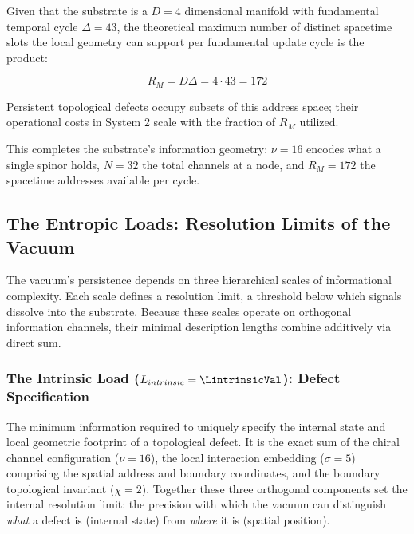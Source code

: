 Given that the substrate is a $D=4$ dimensional manifold with fundamental temporal cycle $\Delta=43$, the theoretical maximum number of distinct spacetime slots the local geometry can support per fundamental update cycle is the product:

\begin{equation}
    R_M = D\Delta = 4 \cdot 43 = 172
\end{equation}

Persistent topological defects occupy subsets of this address space; their operational costs in System 2 scale with the fraction of $R_M$ utilized.

This completes the substrate's information geometry: $\nu=16$ encodes what a single spinor holds, $N=32$ the total channels at a node, and $R_M=172$ the spacetime addresses available per cycle.


\subsection{The Entropic Loads: Resolution Limits of the Vacuum}
\label{sec:lattice_loads}

The vacuum's persistence depends on three hierarchical scales of informational complexity. Each scale defines a resolution limit, a threshold below which signals dissolve into the substrate. Because these scales operate on orthogonal information channels, their minimal description lengths combine additively via direct sum.

\subsubsection{The Intrinsic Load (\texorpdfstring{$L_{intrinsic} = \LintrinsicVal$}{Lintrinsic}): Defect Specification}
\label{subsub:lintrinsic}
The minimum information required to uniquely specify the internal state and local geometric footprint of a topological defect. It is the exact sum of the chiral channel configuration ($\nu=16$), the local interaction embedding ($\sigma=5$) comprising the spatial address and boundary coordinates, and the boundary topological invariant ($\chi=2$). Together these three orthogonal components set the internal resolution limit: the precision with which the vacuum can distinguish \emph{what} a defect is (internal state) from \emph{where} it is (spatial position).

